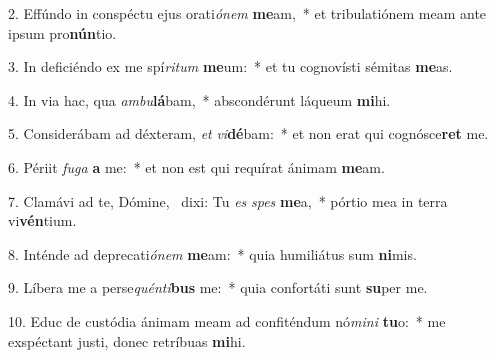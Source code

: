 2. Effúndo in conspéctu ejus orati\textit{ó}\textit{nem} \textbf{me}am,~*  et tribulatiónem meam ante ipsum pro\textbf{nún}tio.\

3. In deficiéndo ex me spí\textit{ri}\textit{tum} \textbf{me}um:~*  et tu cognovísti sémitas \textbf{me}as.\

4. In via hac, qua \textit{am}\textit{bu}\textbf{lá}bam,~*  abscondérunt láqueum \textbf{mi}hi.\

5. Considerábam ad déxteram, \textit{et} \textit{vi}\textbf{dé}bam:~*  et non erat qui cognósce\textbf{ret} me.\

6. Périit \textit{fu}\textit{ga} \textbf{a} me:~*  et non est qui requírat ánimam \textbf{me}am.\

7. Clamávi ad te, Dómine, \dag\  dixi: Tu \textit{es} \textit{spes} \textbf{me}a,~*  pórtio mea in terra vi\textbf{vén}tium.\

8. Inténde ad deprecati\textit{ó}\textit{nem} \textbf{me}am:~*  quia humiliátus sum \textbf{ni}mis.\

9. Líbera me a perse\textit{quén}\textit{ti}\textbf{bus} me:~*  quia confortáti sunt \textbf{su}per me.\

10. Educ de custódia ánimam meam ad confiténdum nó\textit{mi}\textit{ni} \textbf{tu}o:~*  me exspéctant justi, donec retríbuas \textbf{mi}hi.\

